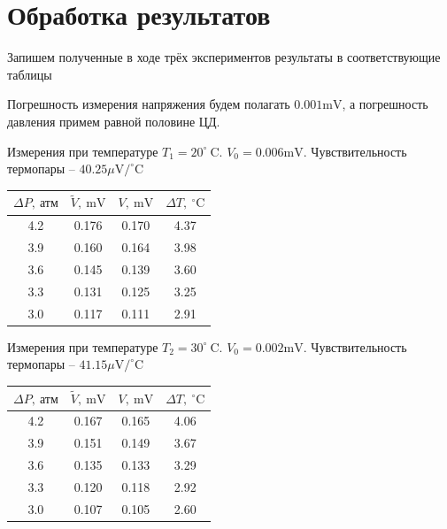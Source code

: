 \documentclass[12pt]{article}
\begin{document}
\section{Обработка результатов}

Запишем полученные в ходе трёх экспериментов результаты в соответствующие таблицы

Погрешность измерения напряжения будем полагать $0.001\text{mV}$, а погрешность давления примем равной половине ЦД.

Измерения при температуре $T_1 = 20^{\circ}~\text{C}$.
$V_0 = 0.006 \text{mV}$.
Чувствительность термопары -- 
$40.25 \mu \text{V} / ^{\circ} \text{C}$
\begin{table}[H]
	\centering
	\begin{tabular}{|c|c|c|c|}
		\hline
		$\Delta P,~\text{атм}$ & $\widetilde{V},~\text{mV}$ & 
		$V,~\text{mV}$ & $\Delta T,~^{\circ}\text{C}$ \\
		\hline
		4.2 & 0.176 & 0.170 & 4.37 \\
		3.9 & 0.160 & 0.164 & 3.98 \\
		3.6 & 0.145 & 0.139 & 3.60 \\
		3.3 & 0.131 & 0.125 & 3.25 \\
		3.0 & 0.117 & 0.111 & 2.91 \\
		\hline
	\end{tabular}
\end{table}

Измерения при температуре $T_2 = 30^{\circ}~\text{C}$.
$V_0 = 0.002 \text{mV}$.
Чувствительность термопары -- 
$41.15 \mu \text{V} / ^{\circ} \text{C}$
\begin{table}[H]
	\centering
	\begin{tabular}{|c|c|c|c|}
		\hline
		$\Delta P,~\text{атм}$ & $\widetilde{V},~\text{mV}$ & 
		$V,~\text{mV}$ & $\Delta T,~^{\circ}\text{C}$ \\
		\hline
		4.2 & 0.167 & 0.165 & 4.06 \\
		3.9 & 0.151 & 0.149 & 3.67 \\
		3.6 & 0.135 & 0.133 & 3.29 \\
		3.3 & 0.120 & 0.118 & 2.92 \\
		3.0 & 0.107 & 0.105 & 2.60 \\
		\hline
	\end{tabular}
\end{table}
\end{document}

